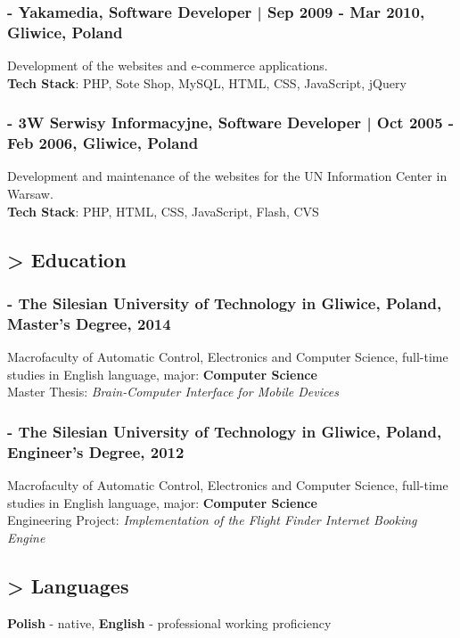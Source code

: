 \documentclass[8pt]{extarticle}
\begin{document}
      \subsubsection*{\normalsize{- Yakamedia, Software Developer | Sep 2009 - Mar 2010, Gliwice, Poland}}
      Development of the websites and e-commerce applications.\\
      \textbf{Tech Stack}: PHP, Sote Shop, MySQL, HTML, CSS, JavaScript, jQuery

      \subsubsection*{\normalsize{- 3W Serwisy Informacyjne, Software Developer | Oct 2005 - Feb 2006, Gliwice, Poland}}
      Development and maintenance of the websites for the UN Information Center in Warsaw.\\
      \textbf{Tech Stack}: PHP, HTML, CSS, JavaScript, Flash, CVS

    \subsection*{\normalsize{> Education}}

      \subsubsection*{\normalsize{- The Silesian University of Technology in Gliwice, Poland, Master's Degree, 2014}}
      Macrofaculty of Automatic Control, Electronics and Computer Science,
      full-time studies in English language, major: \textbf{Computer Science}\\
      Master Thesis: \textit{Brain-Computer Interface for Mobile Devices}

      \subsubsection*{\normalsize{- The Silesian University of Technology in Gliwice, Poland, Engineer's Degree, 2012}}
      Macrofaculty of Automatic Control, Electronics and Computer Science,
      full-time studies in English language, major: \textbf{Computer Science}\\
      Engineering Project: \textit{Implementation of the Flight Finder Internet Booking Engine}

    \subsection*{\normalsize{> Languages}}
    \textbf{Polish} - native, \textbf{English} - professional working proficiency
\end{document}

